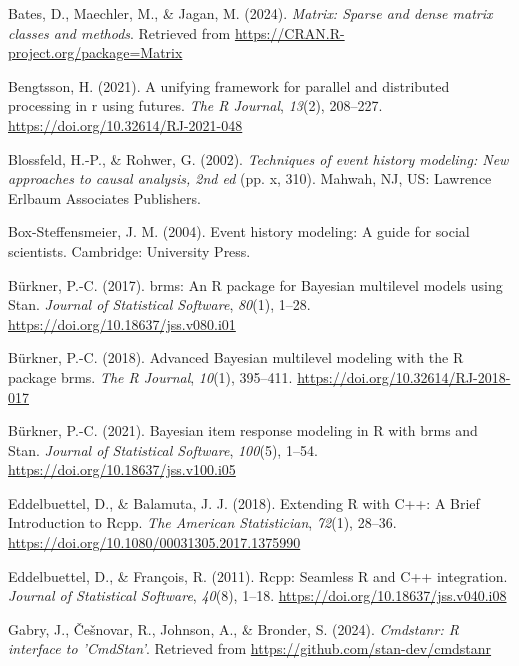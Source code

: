 \documentclass[
  man, donotrepeattitle,floatsintext]{apa6}
\newlength{\cslhangindent}
\newenvironment{CSLReferences}[2] %
 {\begin{list}{}{%
  \setlength{\itemindent}{0pt}
  \setlength{\leftmargin}{0pt}
  \setlength{\parsep}{0pt}
  \ifodd #1
   \setlength{\leftmargin}{\cslhangindent}
   \setlength{\itemindent}{-1\cslhangindent}
  \fi
  \setlength{\itemsep}{#2\baselineskip}}}
 {\end{list}}
\begin{document}
\begin{CSLReferences}{1}{0}
Bates, D., Maechler, M., \& Jagan, M. (2024). \emph{Matrix: Sparse and dense matrix classes and methods}. Retrieved from \url{https://CRAN.R-project.org/package=Matrix}

Bengtsson, H. (2021). A unifying framework for parallel and distributed processing in r using futures. \emph{The R Journal}, \emph{13}(2), 208--227. \url{https://doi.org/10.32614/RJ-2021-048}

Blossfeld, H.-P., \& Rohwer, G. (2002). \emph{Techniques of event history modeling: {New} approaches to causal analysis, 2nd ed} (pp. x, 310). Mahwah, NJ, US: Lawrence Erlbaum Associates Publishers.

Box-Steffensmeier, J. M. (2004). Event history modeling: A guide for social scientists. Cambridge: University Press.

Bürkner, P.-C. (2017). {brms}: An {R} package for {Bayesian} multilevel models using {Stan}. \emph{Journal of Statistical Software}, \emph{80}(1), 1--28. \url{https://doi.org/10.18637/jss.v080.i01}

Bürkner, P.-C. (2018). Advanced {Bayesian} multilevel modeling with the {R} package {brms}. \emph{The R Journal}, \emph{10}(1), 395--411. \url{https://doi.org/10.32614/RJ-2018-017}

Bürkner, P.-C. (2021). Bayesian item response modeling in {R} with {brms} and {Stan}. \emph{Journal of Statistical Software}, \emph{100}(5), 1--54. \url{https://doi.org/10.18637/jss.v100.i05}

Eddelbuettel, D., \& Balamuta, J. J. (2018). {Extending {R} with {C++}: A Brief Introduction to {Rcpp}}. \emph{The American Statistician}, \emph{72}(1), 28--36. \url{https://doi.org/10.1080/00031305.2017.1375990}

Eddelbuettel, D., \& François, R. (2011). {Rcpp}: Seamless {R} and {C++} integration. \emph{Journal of Statistical Software}, \emph{40}(8), 1--18. \url{https://doi.org/10.18637/jss.v040.i08}

Gabry, J., Češnovar, R., Johnson, A., \& Bronder, S. (2024). \emph{Cmdstanr: R interface to 'CmdStan'}. Retrieved from \url{https://github.com/stan-dev/cmdstanr}


\end{CSLReferences}
\end{document}
